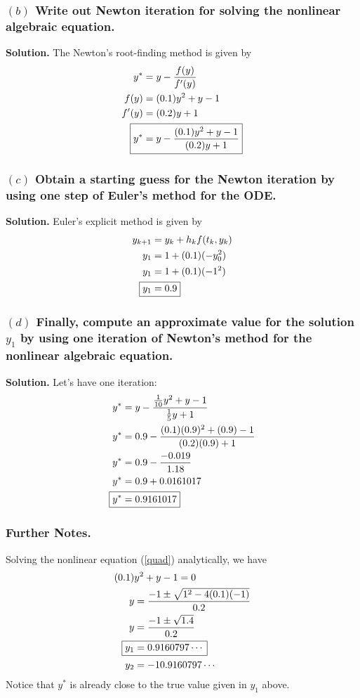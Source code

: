 \subsubsection*{$(b)$ Write out Newton iteration for solving the nonlinear algebraic equation.}
\textbf{Solution.} The Newton's root-finding method is given by
\begin{align*}
y^* &= y - \frac{f(y)}{f'(y)}\\
f(y) &= (0.1)y^2 + y - 1\\
f'(y) &= (0.2)y+1\\
\Aboxed{y^* &= y - \frac{(0.1)y^2+y-1}{(0.2)y+1}}
\end{align*}

\subsubsection*{$(c)$ Obtain a starting guess for the Newton iteration by using one step of Euler's method for the ODE.}
\textbf{Solution.} Euler's explicit method is given by
\begin{align*}
y_{k+1} &= y_k + h_kf(t_k,y_k)\\
y_1 &= 1 + (0.1)(-y_0^2)\\
y_1 &= 1 + (0.1)(-1^2)\\
\Aboxed{y_1 &= 0.9}
\end{align*}

\subsubsection*{$(d)$ Finally, compute an approximate value for the solution $y_1$ by using one iteration of Newton's method for the nonlinear algebraic equation.}
\textbf{Solution.} Let's have one iteration:
\begin{align*}
y^* &= y - \frac{\frac{1}{10}y^2+y-1}{\frac{1}{5}y+1}\\
y^* &= 0.9 - \frac{(0.1)(0.9)^2 + (0.9) - 1}{(0.2)(0.9)+1}\\
y^* &= 0.9 - \frac{-0.019}{1.18}\\
y^* &= 0.9 + 0.0161017\\
\Aboxed{y^* &= 0.9161017}
\end{align*}

\subsubsection*{Further Notes.} Solving the nonlinear equation (\ref{quad}) analytically, we have
\begin{align*}
(0.1)&y^2 + y - 1 = 0\\
y &= \frac{-1 \pm \sqrt{1^2 - 4(0.1)(-1)}}{0.2}\\
y &= \frac{-1 \pm \sqrt{1.4}}{0.2}\\
\Aboxed{y_1 &= 0.9160797\cdots}\\
y_2 &= -10.9160797\cdots
\end{align*}
Notice that $y^*$ is already close to the true value given in $y_1$ above.

